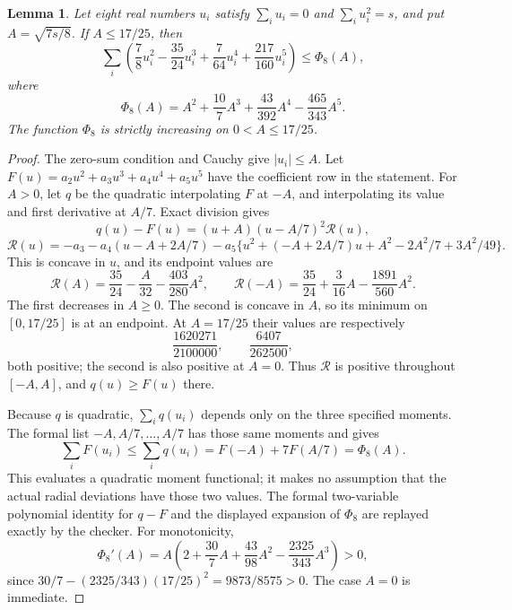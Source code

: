 \documentclass[11pt]{article}
\newtheorem{lemma}[theorem]{Lemma}
\theoremstyle{remark}
\numberwithin{equation}{section}
\begin{document}
\begin{lemma}\label{lem:noorigin-oct8-eight-quintic-dual}
Let eight real numbers $u_i$ satisfy $\sum_i u_i=0$ and
$\sum_i u_i^2=s$, and put $A=\sqrt{7s/8}$. If $A\le17/25$, then
\[
 \sum_i\left(\frac78u_i^2-\frac{35}{24}u_i^3
                +\frac7{64}u_i^4+\frac{217}{160}u_i^5\right)
 \le\Phi_8(A),
\]
where
\[
             \Phi_8(A)=A^2+\frac{10}{7}A^3
                        +\frac{43}{392}A^4-\frac{465}{343}A^5.
\]
The function $\Phi_8$ is strictly increasing on $0<A\le17/25$.
\end{lemma}
\begin{proof}
The zero-sum condition and Cauchy give $|u_i|\le A$.
Let $F(u)=a_2u^2+a_3u^3+a_4u^4+a_5u^5$ have the coefficient
row in the statement. For $A>0$, let $q$ be the quadratic
interpolating $F$ at $-A$, and interpolating its value and first
derivative at $A/7$. Exact division gives
\[
 q(u)-F(u)=(u+A)(u-A/7)^2\mathcal R(u),
\]
\[
 \mathcal R(u)=-a_3-a_4(u-A+2A/7)
 -a_5\{u^2+(-A+2A/7)u+A^2-2A^2/7+3A^2/49\}.
\]
This is concave in $u$, and its endpoint values are
\[
 \mathcal R(A)=\frac{35}{24}-\frac A{32}-\frac{403}{280}A^2,
 \qquad
 \mathcal R(-A)=\frac{35}{24}+\frac3{16}A-\frac{1891}{560}A^2.
\]
The first decreases in $A\ge0$. The second is concave in $A$,
so its minimum on $[0,17/25]$ is at an endpoint. At $A=17/25$
their values are respectively
\[
                   \frac{1620271}{2100000},\qquad
                   \frac{6407}{262500},
\]
both positive; the second is also positive at $A=0$.
Thus $\mathcal R$ is positive throughout $[-A,A]$, and
$q(u)\ge F(u)$ there.

Because $q$ is quadratic, $\sum_iq(u_i)$ depends only on the
three specified moments. The formal list $-A,A/7,\ldots,A/7$
has those same moments and gives
\[
 \sum_iF(u_i)\le\sum_iq(u_i)
                   =F(-A)+7F(A/7)=\Phi_8(A).
\]
This evaluates a quadratic moment functional; it makes no
assumption that the actual radial deviations have those two values.
The formal two-variable polynomial identity for $q-F$ and the
displayed expansion of $\Phi_8$ are replayed exactly by the checker.
For monotonicity,
\[
 \Phi_8'(A)=A\left(2+\frac{30}{7}A+\frac{43}{98}A^2
                                      -\frac{2325}{343}A^3\right)>0,
\]
since $30/7-(2325/343)(17/25)^2=9873/8575>0$.
The case $A=0$ is immediate.
\end{proof}
\end{document}
